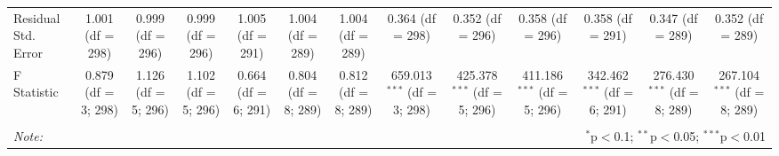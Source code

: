 \begin{table}[!htbp]
\begin{tabular}{@{\extracolsep{5pt}}lcccccccccccc}
Residual Std. Error & 1.001 (df = 298) & 0.999 (df = 296) & 0.999 (df = 296) & 1.005 (df = 291) & 1.004 (df = 289) & 1.004 (df = 289) & 0.364 (df = 298) & 0.352 (df = 296) & 0.358 (df = 296) & 0.358 (df = 291) & 0.347 (df = 289) & 0.352 (df = 289) \\ 
F Statistic & 0.879 (df = 3; 298) & 1.126 (df = 5; 296) & 1.102 (df = 5; 296) & 0.664 (df = 6; 291) & 0.804 (df = 8; 289) & 0.812 (df = 8; 289) & 659.013$^{***}$ (df = 3; 298) & 425.378$^{***}$ (df = 5; 296) & 411.186$^{***}$ (df = 5; 296) & 342.462$^{***}$ (df = 6; 291) & 276.430$^{***}$ (df = 8; 289) & 267.104$^{***}$ (df = 8; 289) \\ 
\hline 
\hline \\[-1.8ex] 
\textit{Note:}  & \multicolumn{12}{r}{$^{*}$p$<$0.1; $^{**}$p$<$0.05; $^{***}$p$<$0.01} \\ 
\end{tabular} 
\end{table} 
